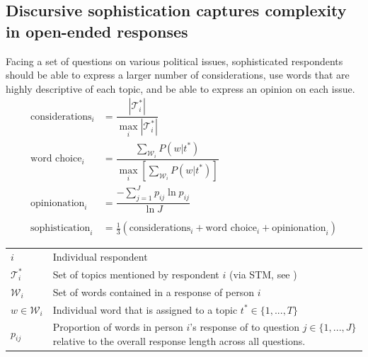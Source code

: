 \documentclass[a0,landscape]{a0poster}
\begin{document}
\begin{multicols}{4}
\section*{Discursive sophistication captures complexity in open-ended responses}
Facing a set of questions on various political issues, sophisticated respondents should be able to express a larger number of considerations, use words that are highly descriptive of each topic, and be able to express an opinion on each issue.
\begin{align*}
\text{considerations}_i &= \dfrac{|\mathcal{T}^*_i|}{\max_i|\mathcal{T}^*_i|}\\
\text{word choice}_i &= \dfrac{\sum_{\mathcal{W}_i} P(w|t^*)}{\max_i\left[\sum_{\mathcal{W}_i} P(w|t^*)\right]}\\
\text{opinionation}_i &= \dfrac{-\sum_{j=1}^J p_{ij} \ln p_{ij}}{\ln J}\\\\
\text{sophistication}_i &= \tfrac{1}{3}(\text{considerations}_i + \text{word choice}_i + \text{opinionation}_i)
\end{align*}
\begin{center}\footnotesize
\begin{tabular}{lp{22cm}}
\toprule 
$i$ & Individual respondent \\
$\mathcal{T}^*_i$ & Set of topics mentioned by respondent $i$ (via STM, see \citealt{roberts2014structural}) \\
$\mathcal{W}_i$ & Set of words contained in a response of person $i$\\
$w\in\mathcal{W}_i$ & Individual word that is assigned to a topic $t^* \in \{1,...,T\} $ \\
$p_{ij}$ & Proportion of words in person $i$'s response of to question $j\in \{1,...,J\}$ relative to the overall response length across all questions. \\
\bottomrule
\end{tabular}
\end{center}



\end{multicols}
\end{document}
